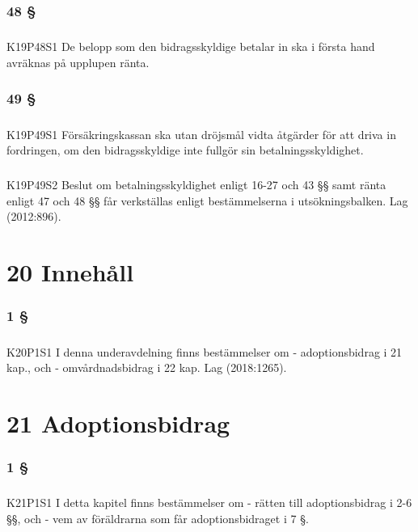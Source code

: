 \documentclass[a4paper,notitlepage,openany,10pt]{book}
\begin{document}
\subsection*{48 §}
\paragraph*{}
{\tiny K19P48S1}
De belopp som den bidragsskyldige betalar in ska i första hand avräknas på upplupen ränta.
\subsection*{49 §}
\paragraph*{}
{\tiny K19P49S1}
Försäkringskassan ska utan dröjsmål vidta åtgärder för att driva in fordringen, om den bidragsskyldige inte fullgör sin betalningsskyldighet.
\paragraph*{}
{\tiny K19P49S2}
Beslut om betalningsskyldighet enligt 16-27 och 43 §§ samt ränta enligt 47 och 48 §§ får verkställas enligt bestämmelserna i utsökningsbalken.
Lag (2012:896).
\chapter*{20 Innehåll}
\subsection*{1 §}
\paragraph*{}
{\tiny K20P1S1}
I denna underavdelning finns bestämmelser om
\newline - adoptionsbidrag i 21 kap., och
\newline - omvårdnadsbidrag i 22 kap.
Lag (2018:1265).
\chapter*{21 Adoptionsbidrag}
\subsection*{1 §}
\paragraph*{}
{\tiny K21P1S1}
I detta kapitel finns bestämmelser om
\newline - rätten till adoptionsbidrag i 2-6 §§, och
\newline - vem av föräldrarna som får adoptionsbidraget i 7 §.
\end{document}
